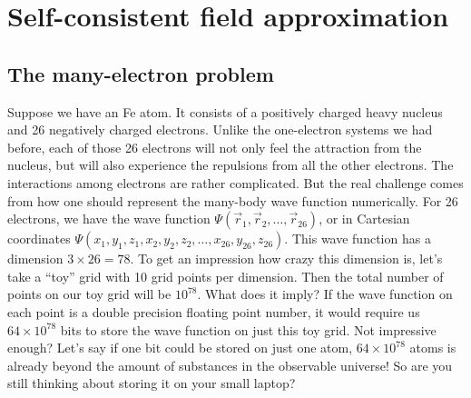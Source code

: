 \chapter{Self-consistent field approximation} \label{ch:3}

\section{The many-electron problem}
Suppose we have an Fe atom. It consists of a positively charged heavy nucleus
and 26 negatively charged electrons. Unlike the one-electron systems we had before,
each of those 26 electrons will not only feel the attraction from the nucleus,
but will also experience the repulsions from all the other electrons. The interactions
among electrons are rather complicated. But the real challenge comes from how
one should represent the many-body wave function numerically. For 26 electrons,
we have the wave function $\Psi(\vec{r}_1,\vec{r}_2,\ldots,\vec{r}_{26})$, or
in Cartesian coordinates $\Psi(x_1,y_1,z_1,x_2,y_2,z_2,\ldots,x_{26},y_{26},z_{26})$.
This wave function has a dimension $3 \times 26 = 78$. To get an impression how
crazy this dimension is, let's take a ``toy'' grid with 10 grid points per
dimension. Then the total number of points on our toy grid will be $10^{78}$.
What does it imply? If the wave function on each point is a double precision
floating point number, it would require us $64 \times 10^{78}$ bits to store the wave function
on just this toy grid. Not impressive enough? Let's say if one bit could be stored on
just one atom, $64 \times 10^{78}$ atoms is already beyond the amount of substances
in the observable universe! So are you still thinking about storing it on your small
laptop?

